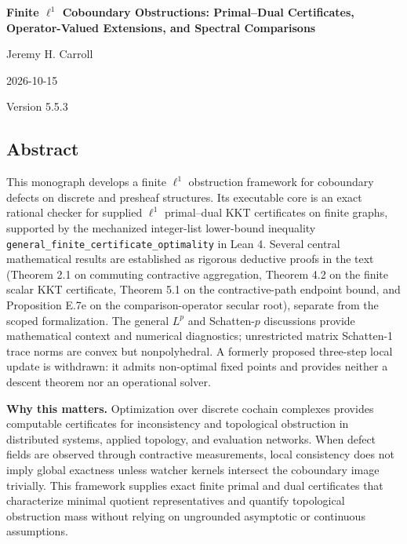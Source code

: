 \documentclass[
]{article}
\author{}
\date{}
\begin{document}
\begin{center}
{\LARGE\bfseries Finite $\ell^1$ Coboundary Obstructions: Primal--Dual Certificates, Operator-Valued Extensions, and Spectral Comparisons \par}
\vspace{0.8em}
{\large Jeremy H. Carroll \par}
\vspace{0.3em}
{\large 2026-10-15 \par}
\vspace{0.3em}
{\large Version 5.5.3 \par}
\end{center}

\subsection{Abstract}\label{abstract}

This monograph develops a finite \(\ell^1\) obstruction framework for coboundary defects on discrete and presheaf structures. Its executable core is an exact rational checker for supplied \(\ell^1\) primal--dual KKT certificates on finite graphs, supported by the mechanized integer-list lower-bound inequality \texttt{general\_finite\_certificate\_optimality} in Lean 4. Several central mathematical results are established as rigorous deductive proofs in the text (Theorem 2.1 on commuting contractive aggregation, Theorem 4.2 on the finite scalar KKT certificate, Theorem 5.1 on the contractive-path endpoint bound, and Proposition E.7e on the comparison-operator secular root), separate from the scoped formalization. The general \(L^p\) and Schatten-\(p\) discussions provide mathematical context and numerical diagnostics; unrestricted matrix Schatten-1 trace norms are convex but nonpolyhedral. A formerly proposed three-step local update is withdrawn: it admits non-optimal fixed points and provides neither a descent theorem nor an operational solver.

\textbf{Why this matters.} Optimization over discrete cochain complexes provides computable certificates for inconsistency and topological obstruction in distributed systems, applied topology, and evaluation networks. When defect fields are observed through contractive measurements, local consistency does not imply global exactness unless watcher kernels intersect the coboundary image trivially. This framework supplies exact finite primal and dual certificates that characterize minimal quotient representatives and quantify topological obstruction mass without relying on ungrounded asymptotic or continuous assumptions.
\end{document}
